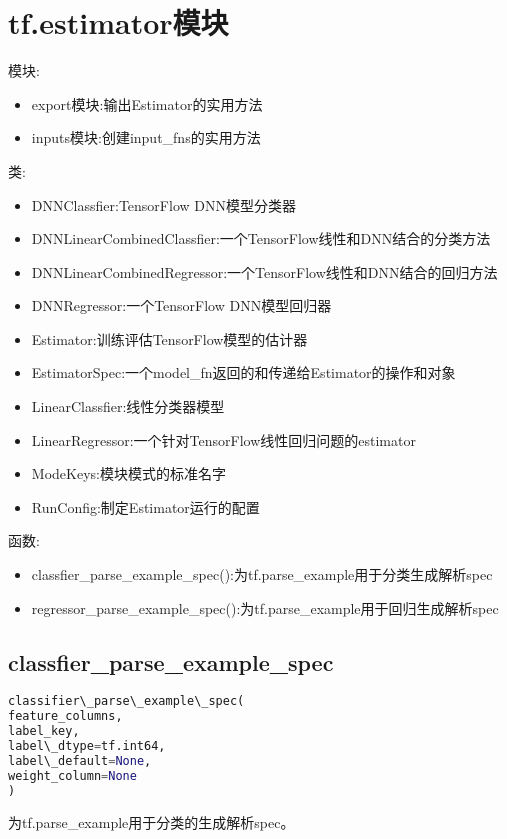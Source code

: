 \section{tf.estimator模块}
模块:
\begin{itemize}
\item export模块:输出Estimator的实用方法
\item inputs模块:创建input\_fns的实用方法
\end{itemize}
类:
\begin{itemize}
\item DNNClassfier:TensorFlow DNN模型分类器
\item DNNLinearCombinedClassfier:一个TensorFlow线性和DNN结合的分类方法
\item DNNLinearCombinedRegressor:一个TensorFlow线性和DNN结合的回归方法
\item DNNRegressor:一个TensorFlow DNN模型回归器
\item Estimator:训练评估TensorFlow模型的估计器
\item EstimatorSpec:一个model\_fn返回的和传递给Estimator的操作和对象
\item LinearClassfier:线性分类器模型
\item LinearRegressor:一个针对TensorFlow线性回归问题的estimator
\item ModeKeys:模块模式的标准名字
\item RunConfig:制定Estimator运行的配置
\end{itemize}
函数:
\begin{itemize}
\item classfier\_parse\_example\_spec():为tf.parse\_example用于分类生成解析spec
\item regressor\_parse\_example\_spec():为tf.parse\_example用于回归生成解析spec
\end{itemize}
\subsection{classfier\_parse\_example\_spec}
\begin{lstlisting}[language=Python]
classifier\_parse\_example\_spec(
feature_columns,
label_key,
label\_dtype=tf.int64,
label\_default=None,
weight_column=None
)
\end{lstlisting}
为tf.parse\_example用于分类的生成解析spec。

